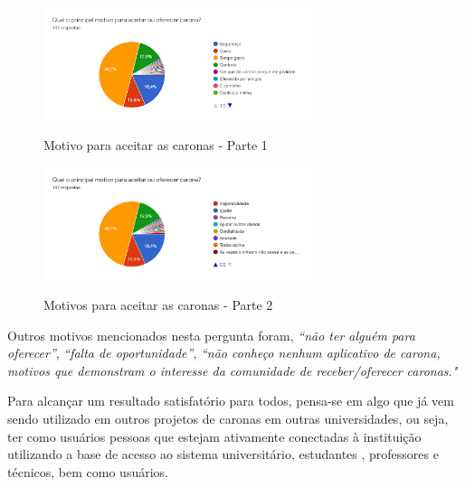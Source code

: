 \begin{figure}[!hbtp]
	\centering
	\caption{Motivo para aceitar as caronas - Parte 1}
	\includegraphics[width=0.7\textwidth]{./04-figuras/questionario/3.png}
	\label{fig:aceitacaopelascaronas}
\end{figure}

\begin{figure}[!hbtp]
	\centering
	\caption{Motivos para aceitar as caronas - Parte 2}
	\includegraphics[width=0.7\textwidth]{./04-figuras/questionario/4.png}
	\label{fig:aceitacaopelascaronas2}
\end{figure}

Outros motivos mencionados nesta pergunta foram, \textit{“não ter alguém para oferecer”}, \textit{“falta de oportunidade”}, \textit{“não conheço nenhum aplicativo de carona, motivos que demonstram o interesse da comunidade de receber/oferecer caronas."}

Para alcançar um resultado satisfatório para todos, pensa-se em algo que já vem sendo utilizado em outros projetos de caronas em outras universidades, ou seja, ter como usuários pessoas que estejam ativamente conectadas à instituição utilizando a base de acesso ao sistema universitário, estudantes , professores e técnicos, bem como usuários.

